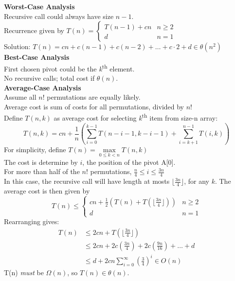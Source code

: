 \documentclass[12pt]{article}
\theoremstyle{definition}
\begin{document}
\textbf{Worst-Case Analysis} \\
Recursive call could always have size $n-1$. \\
Recurrence given by
$
T(n) =
\begin{cases}
T(n-1) + cn &n \geq 2 \\
d &n = 1
\end{cases}
$ \\
Solution: $T(n) = cn + c(n-1) + c(n-2) + \dots + c \cdot 2 + d \in \theta(n^{2})$ \\

\textbf{Best-Case Analysis} \\
First chosen pivot could be the \emph{k}\textsuperscript{th} element. \\
No recursive calls; total cost if $\theta(n)$. \\

\textbf{Average-Case Analysis} \\
Assume all $n!$ permutations are equally likely. \\
Average cost is sum of costs for all permutations, divided by $n!$ \\
Define $T(n,k)$ as average cost for selecting \emph{k}\textsuperscript{th} item from size-n array:
$$T(n,k) = cn + \frac{1}{n}\left(\sum_{i=0}^{k-1}T(n-i-1,k-i-1) + \sum_{i=k+1}^{n-1}T(i,k)\right)$$
For simplicity, define $T(n) = \underset{0 \leq k < n}{\max} T(n,k)$ \\
The cost is determine by $i$, the position of the pivot A[0]. \\
For more than half of the $n!$ permutations, $\frac{n}{4} \leq i \leq \frac{3n}{4}$ \\

In this case, the recursive call will have length at mosts $\lfloor\frac{3n}{4}\rfloor$, for any $k$.
The average cost is then given by
\[
T(n) \leq
\begin{cases}
cn + \frac{1}{2}\left(T(n) + T(\lfloor\frac{3n}{4}\rfloor)\right) &n \geq 2 \\
d &n = 1
\end{cases}
\]
Rearranging gives:
\begin{align*}
  T(n) &\leq 2cn + T(\lfloor\frac{3n}{4}\rfloor) \\
  &\leq 2cn + 2c(\frac{3n}{4}) + 2c(\frac{9n}{16}) + \dots + d \\
  &\leq d + 2cn\sum_{i=0}^{\infty}(\frac{3}{4})^{i} \in O(n)
\end{align*}
T(n) \emph{must} be $\Omega(n)$, so $T(n) \in \theta(n)$.
\end{document}

